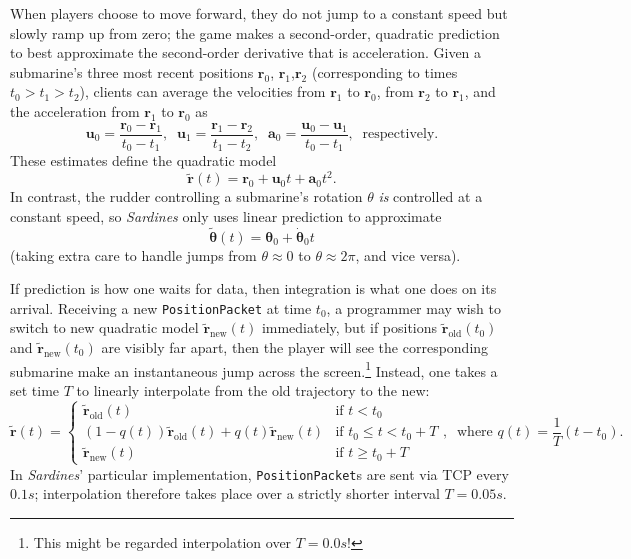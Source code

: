 \documentclass[a4paper, 9pt]{article}
\begin{document}
\begin{flushleft}
\vspace{5pt}\noindent
When players choose to move forward, they do not jump to a constant speed but slowly ramp up from zero; the game makes a second-order, quadratic prediction to best approximate the second-order derivative that is acceleration. Given a submarine's three most recent positions $\mathbf{r}_0$, $\mathbf{r}_1$,$\mathbf{r}_2$ (corresponding to times $t_0 > t_1 > t_2$), clients can average the velocities from $\mathbf{r}_1$ to $\mathbf{r}_0$, from $\mathbf{r}_2$ to $\mathbf{r}_1$, and the acceleration from $\mathbf{r}_1$ to $\mathbf{r}_0$ as
$$\mathbf{u}_0 = \frac{\mathbf{r}_0-\mathbf{r}_1}{t_0-t_1}, \;\; \mathbf{u}_1 = \frac{\mathbf{r}_1-\mathbf{r}_2}{t_1-t_2}, \;\; \mathbf{a}_0 = \frac{\mathbf{u}_0-\mathbf{u}_1}{t_0-t_1}, \;\; \textrm{respectively.}$$
These estimates define the quadratic model
$$ \mathbf{\tilde{r}}(t) = \mathbf{r}_0+\mathbf{u}_0t+\mathbf{a}_0t^2.$$
In contrast, the rudder controlling a submarine's rotation $\theta$ \textit{is} controlled at a constant speed, so \textit{Sardines} only uses linear prediction to approximate
$$\mathbf{\tilde{\theta}}(t) = \mathbf{\theta}_0+\mathbf{\dot{\theta}}_0t$$
(taking extra care to handle jumps from $\theta \approx 0$ to $\theta \approx 2\pi$, and vice versa).


\vspace{5pt}\noindent
If prediction is how one waits for data, then integration is what one does on its arrival. Receiving a new \texttt{PositionPacket} at time $t_0$, a programmer may wish to switch to new quadratic model $\mathbf{\tilde{r}}_{\textrm{new}}(t)$ immediately, but if positions $\mathbf{\tilde{r}}_{\textrm{old}}(t_0)$ and $\mathbf{\tilde{r}}_{\textrm{new}}(t_0)$ are visibly far apart, then the player will see the corresponding submarine make an instantaneous jump across the screen.\footnote{This might be regarded interpolation over $T = 0.0s$!} Instead, one takes a set time $T$ to linearly interpolate from the old trajectory to the new:
$$\mathbf{\tilde{r}}(t) = \begin{cases} 
\mathbf{\tilde{r}}_{\textrm{old}}(t) & \textrm{if $t < t_0$} \\
(1-q(t))\mathbf{\tilde{r}}_{\textrm{old}}(t) + q(t)\mathbf{\tilde{r}}_{\textrm{new}}(t) & \textrm{if $t_0 \leq t < t_0+T$} \\
\mathbf{\tilde{r}}_{\textrm{new}}(t) & \textrm{if $t \geq t_0+T$}
\end{cases}, \;\; \textrm{where $q(t) = \frac{1}{T}\left(t-t_0\right)$.}$$
In \textit{Sardines}' particular implementation, \texttt{PositionPacket}s are sent via TCP every $0.1s$; interpolation therefore takes place over a strictly shorter interval $T = 0.05s$. 


\end{flushleft}
\end{document}
